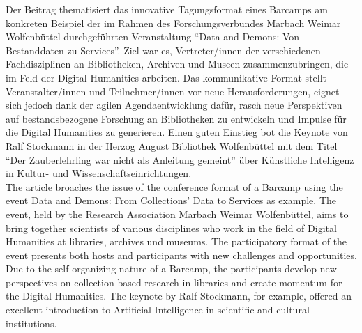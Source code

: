 Der Beitrag thematisiert das innovative Tagungsformat eines Barcamps am
konkreten Beispiel der im Rahmen des Forschungsverbundes Marbach Weimar
Wolfenbüttel durchgeführten Veranstaltung ``Data and Demons: Von
Bestanddaten zu Services''. Ziel war es, Vertreter/innen der
verschiedenen Fachdisziplinen an Bibliotheken, Archiven und Museen
zusammenzubringen, die im Feld der Digital Humanities arbeiten. Das
kommunikative Format stellt Veranstalter/innen und Teilnehmer/innen vor
neue Herausforderungen, eignet sich jedoch dank der agilen
Agendaentwicklung dafür, rasch neue Perspektiven auf bestandsbezogene
Forschung an Bibliotheken zu entwickeln und Impulse für die Digital
Humanities zu generieren. Einen guten Einstieg bot die Keynote von Ralf
Stockmann in der Herzog August Bibliothek Wolfenbüttel mit dem Titel
``Der Zauberlehrling war nicht als Anleitung gemeint'' über Künstliche
Intelligenz in Kultur- und Wissenschaftseinrichtungen.\\

The article broaches the issue of the conference format of a Barcamp
using the event Data and Demons: From Collections' Data to Services as
example. The event, held by the Research Association Marbach Weimar
Wolfenbüttel, aims to bring together scientists of various disciplines
who work in the field of Digital Humanities at libraries, archives und
museums. The participatory format of the event presents both hosts and
participants with new challenges and opportunities. Due to the
self-organizing nature of a Barcamp, the participants develop new
perspectives on collection-based research in libraries and create
momentum for the Digital Humanities. The keynote by Ralf Stockmann, for
example, offered an excellent introduction to Artificial Intelligence in
scientific and cultural institutions.

